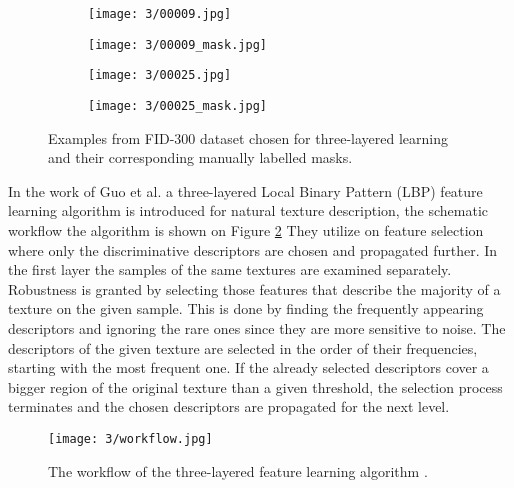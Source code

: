 \documentclass[draft,final]{vutinfth} %
\begin{document}
\begin{figure}[h]
  \centering
  \begin{subfigure}[t]{0.24\columnwidth}
    \centering
    \texttt{[image: 3/00009.jpg]}
  \end{subfigure}
  \begin{subfigure}[t]{0.24\columnwidth}
    \centering
    \texttt{[image: 3/00009\_mask.jpg]}
  \end{subfigure}
  \begin{subfigure}[t]{0.24\columnwidth}
    \centering
    \texttt{[image: 3/00025.jpg]}
  \end{subfigure}
  \begin{subfigure}[t]{0.24\columnwidth}
    \centering
    \texttt{[image: 3/00025\_mask.jpg]}
  \end{subfigure}
  \caption{Examples from FID-300 \cite{kortylewski2014unsupervised} dataset chosen for three-layered learning and their corresponding manually labelled masks.}
  \label{fig:pe:mask}
\end{figure}

\par
In the work of Guo et al. \cite{guo2012discriminative} a three-layered Local Binary Pattern (LBP) feature learning algorithm is introduced for natural texture description, the schematic workflow the algorithm is shown on Figure \ref{fig:pe:workflow}
They utilize on feature selection where only the discriminative descriptors are chosen and propagated further.
In the first layer the samples of the same textures are examined separately.
Robustness is granted by selecting those features that describe the majority of a texture on the given sample.
This is done by finding the frequently appearing descriptors and ignoring the rare ones since they are more sensitive to noise.
The descriptors of the given texture are selected in the order of their frequencies, starting with the most frequent one.
If the already selected descriptors cover a bigger region of the original texture than a given threshold, the selection process terminates and the chosen descriptors are propagated for the next level.

\begin{figure}[h]
  \centering
  \texttt{[image: 3/workflow.jpg]}
  \caption{The workflow of the three-layered feature learning algorithm  \cite{guo2012discriminative}.}
  \label{fig:pe:workflow} %
\end{figure}
\end{document}
